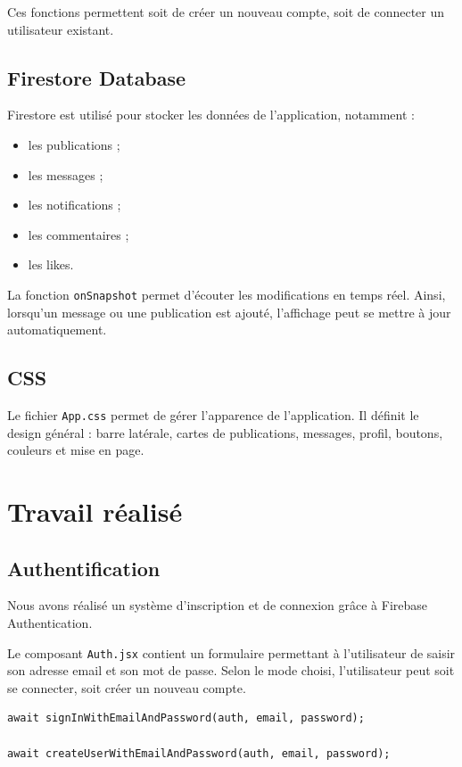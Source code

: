 \documentclass[a4paper, 12pt, twoside]{article}
\begin{document}
Ces fonctions permettent soit de créer un nouveau compte, soit de connecter un utilisateur existant.

\subsection{Firestore Database}

Firestore est utilisé pour stocker les données de l'application, notamment :

\begin{itemize}
    \item les publications ;
    \item les messages ;
    \item les notifications ;
    \item les commentaires ;
    \item les likes.
\end{itemize}

La fonction \texttt{onSnapshot} permet d'écouter les modifications en temps réel. 
Ainsi, lorsqu'un message ou une publication est ajouté, l'affichage peut se mettre à jour automatiquement.

\subsection{CSS}

Le fichier \texttt{App.css} permet de gérer l'apparence de l'application. 
Il définit le design général : barre latérale, cartes de publications, messages, profil, boutons, couleurs et mise en page.

\section{Travail réalisé}

\subsection{Authentification}

Nous avons réalisé un système d'inscription et de connexion grâce à Firebase Authentication.

Le composant \texttt{Auth.jsx} contient un formulaire permettant à l'utilisateur de saisir son adresse email et son mot de passe. 
Selon le mode choisi, l'utilisateur peut soit se connecter, soit créer un nouveau compte.

\begin{lstlisting}
await signInWithEmailAndPassword(auth, email, password);

await createUserWithEmailAndPassword(auth, email, password);
\end{lstlisting}
\end{document}

